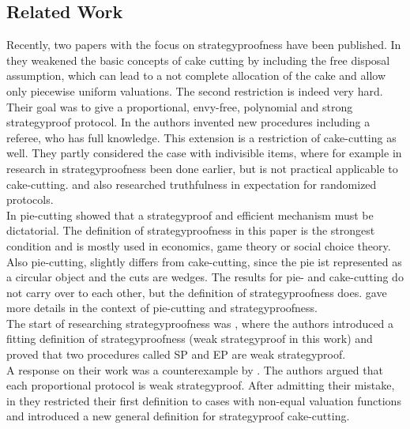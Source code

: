 \subsection{Related Work}
Recently, two papers with the focus on strategyproofness have been published. In \cite{chen:truth} they weakened the basic concepts of cake cutting by including the free disposal assumption, which can lead to a not complete allocation of the cake and allow only piecewise uniform valuations. The second restriction is indeed very hard. Their goal was to give a proportional, envy-free, polynomial and strong strategyproof protocol. In \cite{tamuz} the authors invented new procedures including a referee, who has full knowledge. This extension is a restriction of cake-cutting as well. They partly considered the case with indivisible items, where for example in \cite{Lipton} research in strategyproofness been done earlier, but is not practical applicable to cake-cutting. \cite{chen:truth} and \cite{tamuz} also researched truthfulness in expectation for randomized protocols.\\ \newline
In pie-cutting \cite{why} showed that a strategyproof and efficient mechanism must be dictatorial. The definition of strategyproofness in this paper is the strongest condition and is mostly used in economics, game theory or social choice theory. Also pie-cutting, slightly differs from cake-cutting, since the pie ist represented as a circular object and the cuts are wedges. The results for pie-  and cake-cutting do not carry over to each other, but the definition of strategyproofness does. \cite{pie} gave more details in the context of pie-cutting and strategyproofness. \\
\newline
The start of researching strategyproofness was \cite{brams}, where the authors introduced a fitting definition of strategyproofness (weak strategyproof in this work) and proved that two procedures called SP and EP are weak strategyproof.\\ A response on their work was a counterexample by \cite{ccc}. The authors argued that each proportional protocol is weak strategyproof. After admitting their mistake, in \cite{note} they restricted their first definition to cases with non-equal valuation functions and introduced a new general definition for strategyproof cake-cutting.\\
